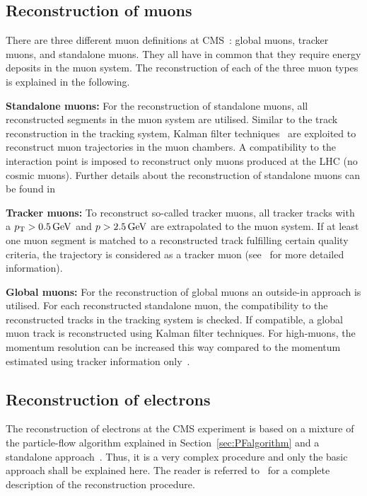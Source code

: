\subsection{Reconstruction of muons}
\label{subsec:MuonReconstruction}
There are three different muon definitions at CMS~\cite{bib:CMS:muon_recoEff}: global muons, tracker muons, and standalone muons.
They all have in common that they require energy deposits in the muon system.
The reconstruction of each of the three muon types is explained in the following.
\begin{description}
\item \textbf{Standalone muons:} For the reconstruction of standalone muons, all reconstructed segments in the muon system are utilised. 
                                 Similar to the track reconstruction in the tracking system, Kalman filter techniques~\cite{bib:KalmanFilter_1987} are exploited to reconstruct muon trajectories in the muon chambers.
                                 A compatibility to the interaction point is imposed to reconstruct only muons produced at the LHC (no cosmic muons).
                                 Further details about the reconstruction of standalone muons can be found in~\cite{bib:StandaloneMuonReconstruction,bib:CMS:TDR_2006} 
\item \textbf{Tracker muons:} To reconstruct so-called tracker muons, all tracker tracks with a $p_{\text{T}}>0.5\,\text{Ge}\kern-0.06667em\text{V}$ and $p>2.5\,\text{Ge}\kern-0.06667em\text{V}$ are extrapolated to the muon system. 
                              If at least one muon segment is matched to a reconstructed track fulfilling certain quality criteria, the trajectory is considered as a tracker muon (see~\cite{bib:CMS:muon_recoEff} for more detailed information).
\item \textbf{Global muons:} For the reconstruction of global muons an outside-in approach is utilised. 
                             For each reconstructed standalone muon, the compatibility to the reconstructed tracks in the tracking system is checked. 
                             If compatible, a global muon track is reconstructed using Kalman filter techniques. 
                             For high-\pt muons, the momentum resolution can be increased this way compared to the momentum estimated using tracker information only~\cite{bib:CMS:muon_recoEff}.
\end{description}

\subsection{Reconstruction of electrons}
\label{subsec:ElectronReconstruction}
The reconstruction of electrons at the CMS experiment is based on a mixture of the particle-flow algorithm explained in Section~\ref{sec:PFalgorithm} and a standalone approach~\cite{bib:StandaloneElectronReconstruction}.
Thus, it is a very complex procedure and only the basic approach shall be explained here.
The reader is referred to~\cite{bib:CMS:elec_recoEff} for a complete description of the reconstruction procedure.

